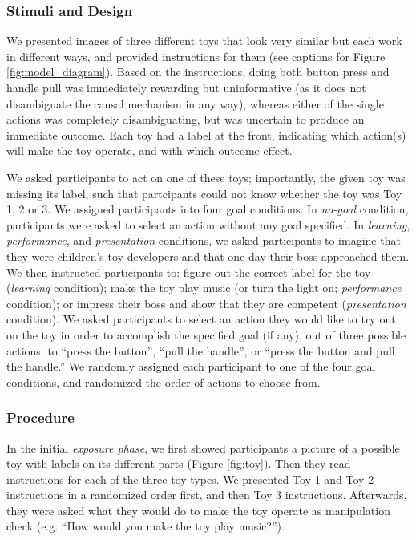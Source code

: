 \documentclass[10pt, letterpaper]{article}
\begin{document}
\subsubsection{Stimuli and Design}\label{stimuli-and-design}

We presented images of three different toys that look very similar but
each work in different ways, and provided instructions for them (see
captions for Figure \ref{fig:model_diagram}). Based on the instructions,
doing both button press and handle pull was immediately rewarding but
uninformative (as it does not disambiguate the causal mechanism in any
way), whereas either of the single actions was completely
disambiguating, but was uncertain to produce an immediate outcome. Each
toy had a label at the front, indicating which action(s) will make the
toy operate, and with which outcome effect.

We asked participants to act on one of these toys; importantly, the
given toy was missing its label, such that partcipants could not know
whether the toy was Toy 1, 2 or 3. We assigned participants into four
goal conditions. In \emph{no-goal} condition, participants were asked to
select an action without any goal specified. In \emph{learning},
\emph{performance}, and \emph{presentation} conditions, we asked
participants to imagine that they were children's toy developers and
that one day their boss approached them. We then instructed participants
to: figure out the correct label for the toy (\emph{learning}
condition); make the toy play music (or turn the light on;
\emph{performance} condition); or impress their boss and show that they
are competent (\emph{presentation} condition). We asked participants to
select an action they would like to try out on the toy in order to
accomplish the specified goal (if any), out of three possible actions:
to ``press the button'', ``pull the handle'', or ``press the button and
pull the handle.'' We randomly assigned each participant to one of the
four goal conditions, and randomized the order of actions to choose
from.

\subsubsection{Procedure}\label{procedure}

In the initial \emph{exposure phase}, we first showed participants a
picture of a possible toy with labels on its different parts (Figure
\ref{fig:toy}). Then they read instructions for each of the three toy
types. We presented Toy 1 and Toy 2 instructions in a randomized order
first, and then Toy 3 instructions. Afterwards, they were asked what
they would do to make the toy operate as manipulation check (e.g. ``How
would you make the toy play music?'').
\end{document}
